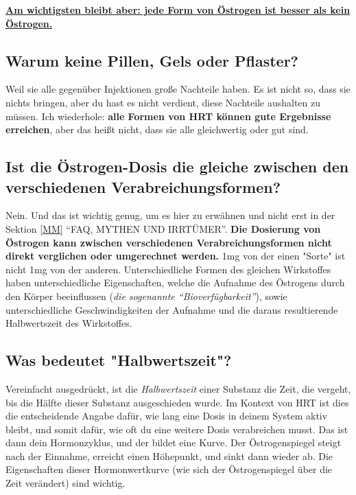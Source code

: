 \documentclass{article}
\begin{document}
\noindent\underline{\textbf{Am wichtigsten bleibt aber: jede Form von Östrogen ist besser als kein Östrogen.}}

\subsection{Warum keine Pillen, Gels oder Pflaster?}

Weil sie alle gegenüber Injektionen große Nachteile haben. Es ist nicht so, dass sie nichts bringen, aber du hast es nicht verdient, diese Nachteile aushalten zu müssen. Ich wiederhole: \textbf{alle Formen von HRT können gute Ergebnisse erreichen}, aber das heißt nicht, dass sie alle gleichwertig oder gut sind.

\subsection{Ist die Östrogen-Dosis die gleiche zwischen den verschiedenen Verabreichungsformen?}

Nein. Und das ist wichtig genug, um es hier zu erwähnen und nicht erst in der Sektion \ref{MM} “FAQ, MYTHEN UND IRRTÜMER”. \textbf{Die Dosierung von Östrogen kann zwischen verschiedenen Verabreichungsformen nicht direkt verglichen oder umgerechnet werden.} 1mg von der einen "Sorte" ist nicht 1mg von der anderen. Unterschiedliche Formen des gleichen Wirkstoffes haben unterschiedliche Eigenschaften, welche die Aufnahme des Östrogens durch den Körper beeinflussen (\textit{die sogenannte “Bioverfügbarkeit”}), sowie unterschiedliche Geschwindigkeiten der Aufnahme und die daraus resultierende Halbwertszeit des Wirkstoffes.

\subsection{Was bedeutet "Halbwertszeit"?}

Vereinfacht ausgedrückt, ist die \textit{Halbwertszeit} einer Substanz die Zeit, die vergeht, bis die Hälfte dieser Substanz ausgeschieden wurde. Im Kontext von HRT ist dies die entscheidende Angabe dafür, wie lang eine Dosis in deinem System aktiv bleibt, und somit dafür, wie oft du eine weitere Dosis verabreichen musst. Das ist dann dein Hormonzyklus, und der bildet eine Kurve. Der Östrogenspiegel steigt nach der Einnahme, erreicht einen Höhepunkt, und sinkt dann wieder ab. Die Eigenschaften dieser Hormonwertkurve (wie sich der Östrogenspiegel über die Zeit verändert) sind wichtig.
\end{document}
